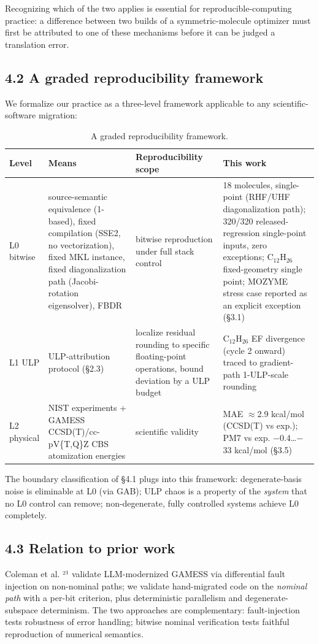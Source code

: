 \documentclass[preprint,12pt]{elsarticle}
\begin{document}
Recognizing which of the two applies is essential for reproducible-computing practice: a difference between two builds of a symmetric-molecule optimizer must first be attributed to one of these mechanisms before it can be judged a translation error.


\subsection{4.2 A graded reproducibility framework}
We formalize our practice as a three-level framework applicable to any scientific-software migration:

\begin{table}[htbp]
\centering
\caption{A graded reproducibility framework.}
\label{tab:Agradedreproduci}
\begin{tabular}{llll}
\hline
\textbf{Level} & \textbf{Means} & \textbf{Reproducibility scope} & \textbf{This work} \\
\hline
L0 bitwise & source-semantic equivalence (1-based), fixed compilation (SSE2, no vectorization), fixed MKL instance, fixed diagonalization path (Jacobi-rotation eigensolver), FBDR & bitwise reproduction under full stack control & 18 molecules, single-point (RHF/UHF diagonalization path); 320/320 released-regression single-point inputs, zero exceptions; C$_{12}$H$_{26}$ fixed-geometry single point; MOZYME stress case reported as an explicit exception (\S{}3.1) \\
L1 ULP & ULP-attribution protocol (\S{}2.3) & localize residual rounding to specific floating-point operations, bound deviation by a ULP budget & C$_{12}$H$_{26}$ EF divergence (cycle 2 onward) traced to gradient-path 1-ULP-scale rounding \\
L2 physical & NIST experiments + GAMESS CCSD(T)/cc-pV\{T,Q\}Z CBS atomization energies & scientific validity & MAE $\approx$2.9 kcal/mol (CCSD(T) vs exp.); PM7 vs exp. $-$0.4\ldots{}$-$33 kcal/mol (\S{}3.5) \\
\hline
\end{tabular}
\end{table}

The boundary classification of \S{}4.1 plugs into this framework: degenerate-basis noise is eliminable at L0 (via GAB); ULP chaos is a property of the \textit{system} that no L0 control can remove; non-degenerate, fully controlled systems achieve L0 completely.


\subsection{4.3 Relation to prior work}
Coleman et al. ²¹ validate LLM-modernized GAMESS via differential fault injection on non-nominal paths; we validate hand-migrated code on the \textit{nominal path} with a per-bit criterion, plus deterministic parallelism and degenerate-subspace determinism. The two approaches are complementary: fault-injection tests robustness of error handling; bitwise nominal verification tests faithful reproduction of numerical semantics.
\end{document}
